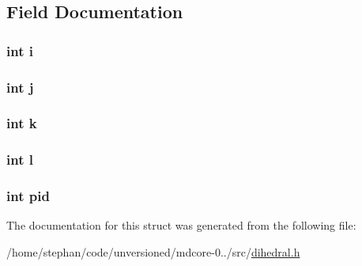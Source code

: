 \subsection{Field Documentation}
\hypertarget{structdihedral_acb559820d9ca11295b4500f179ef6392}{
\subsubsection[{i}]{\setlength{\rightskip}{0pt plus 5cm}int i}}\label{structdihedral_acb559820d9ca11295b4500f179ef6392}
\hypertarget{structdihedral_a37d972ae0b47b9099e30983131d31916}{
\subsubsection[{j}]{\setlength{\rightskip}{0pt plus 5cm}int j}}\label{structdihedral_a37d972ae0b47b9099e30983131d31916}
\hypertarget{structdihedral_ab66ed8e0098c0a86b458672a55a9cca9}{
\subsubsection[{k}]{\setlength{\rightskip}{0pt plus 5cm}int k}}\label{structdihedral_ab66ed8e0098c0a86b458672a55a9cca9}
\hypertarget{structdihedral_a89606eca6b563ec68d2da2e84657736f}{
\subsubsection[{l}]{\setlength{\rightskip}{0pt plus 5cm}int l}}\label{structdihedral_a89606eca6b563ec68d2da2e84657736f}
\hypertarget{structdihedral_af500917c052066b40cf47f96b43c607b}{
\subsubsection[{pid}]{\setlength{\rightskip}{0pt plus 5cm}int pid}}\label{structdihedral_af500917c052066b40cf47f96b43c607b}


The documentation for this struct was generated from the following file\-:\begin{DoxyCompactItemize}
\item 
/home/stephan/code/unversioned/mdcore-\/0../src/\hyperlink{dihedral_8h}{dihedral.\-h}\end{DoxyCompactItemize}
